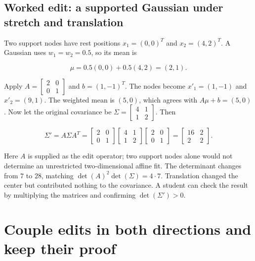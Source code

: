 \subsection{Worked edit: a supported Gaussian under stretch and translation}\label{04-visual-computing-ii-ch039-worked-edit-a-supported-gaussian-under-stretch-and-translation}

Two support nodes have rest positions \(x_1=(0,0)^T\) and \(x_2=(4,2)^T\). A Gaussian uses \(w_1=w_2=0.5\), so its mean is

\[
\mu=0.5(0,0)+0.5(4,2)=(2,1).
\]

Apply \(A=\begin{bmatrix}2&0\\0&1\end{bmatrix}\) and \(b=(1,-1)^T\). The nodes become \(x'_1=(1,-1)\) and \(x'_2=(9,1)\). The weighted mean is \((5,0)\), which agrees with \(A\mu+b=(5,0)\). Now let the original covariance be \(\Sigma=\begin{bmatrix}4&1\\1&2\end{bmatrix}\). Then

\[
\Sigma'=A\Sigma A^T=
\begin{bmatrix}2&0\\0&1\end{bmatrix}
\begin{bmatrix}4&1\\1&2\end{bmatrix}
\begin{bmatrix}2&0\\0&1\end{bmatrix}
=
\begin{bmatrix}16&2\\2&2\end{bmatrix}.
\]

Here \(A\) is supplied as the edit operator; two support nodes alone would not determine an unrestricted two-dimensional affine fit. The determinant changes from \(7\) to \(28\), matching \(\det(A)^2\det(\Sigma)=4\cdot7\). Translation changed the center but contributed nothing to the covariance. A student can check the result by multiplying the matrices and confirming \(\det(\Sigma')>0\).

\section{Couple edits in both directions and keep their proof}\label{04-visual-computing-ii-ch039-couple-edits-in-both-directions-and-keep-their-proof}

